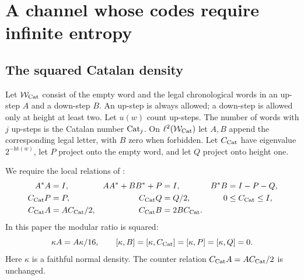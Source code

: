 \section{A channel whose codes require infinite entropy}\label{sec:catalan}
\subsection{The squared Catalan density}
Let $\mathcal W_{\rm Cat}$ consist of the empty word and the legal chronological words in an up-step $A$ and a down-step $B$. An up-step is always allowed; a down-step is allowed only at height at least two. Let $u(w)$ count up-steps. The number of words with $j$ up-steps is the Catalan number $\operatorname{Cat}_j$. On $\ell^2(\mathcal W_{\rm Cat})$ let $A,B$ append the corresponding legal letter, with $B$ zero when forbidden. Let $C_{\mathrm{Cat}}$ have eigenvalue $2^{-\mathrm{ht}(w)}$, let $P$ project onto the empty word, and let $Q$ project onto height one.

We require the local relations of \cite[Section~3]{Entropy}:
\begin{align}
 A^*A&=I,& AA^*+BB^*+P&=I,& B^*B&=I-P-Q,\label{eq:Catlocal}\\
 C_{\mathrm{Cat}} P&=P,& C_{\mathrm{Cat}} Q&=Q/2,&0&\leq C_{\mathrm{Cat}}\leq I,\label{eq:Catboundary}\\
 C_{\mathrm{Cat}} A&=AC_{\mathrm{Cat}}/2,& C_{\mathrm{Cat}} B&=2BC_{\mathrm{Cat}}.&&\label{eq:Catcounter}
\end{align}
In this paper the modular ratio is squared:
\begin{equation}\label{eq:Catsquared}
 \kappa A=A\kappa/16,\qquad[\kappa,B]=[\kappa,C_{\mathrm{Cat}}]=[\kappa,P]=[\kappa,Q]=0.
\end{equation}
Here $\kappa$ is a faithful normal density. The counter relation $C_{\mathrm{Cat}} A=AC_{\mathrm{Cat}}/2$ is unchanged.


